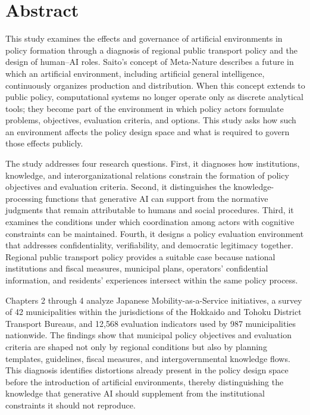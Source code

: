 
\chapter*{Abstract}

This study examines the effects and governance of artificial environments in policy formation through a diagnosis of regional public transport policy and the design of human--AI roles. Saito's concept of Meta-Nature describes a future in which an artificial environment, including artificial general intelligence, continuously organizes production and distribution. When this concept extends to public policy, computational systems no longer operate only as discrete analytical tools; they become part of the environment in which policy actors formulate problems, objectives, evaluation criteria, and options. This study asks how such an environment affects the policy design space and what is required to govern those effects publicly.

The study addresses four research questions. First, it diagnoses how institutions, knowledge, and interorganizational relations constrain the formation of policy objectives and evaluation criteria. Second, it distinguishes the knowledge-processing functions that generative AI can support from the normative judgments that remain attributable to humans and social procedures. Third, it examines the conditions under which coordination among actors with cognitive constraints can be maintained. Fourth, it designs a policy evaluation environment that addresses confidentiality, verifiability, and democratic legitimacy together. Regional public transport policy provides a suitable case because national institutions and fiscal measures, municipal plans, operators' confidential information, and residents' experiences intersect within the same policy process.

Chapters 2 through 4 analyze Japanese Mobility-as-a-Service initiatives, a survey of 42 municipalities within the jurisdictions of the Hokkaido and Tohoku District Transport Bureaus, and 12,568 evaluation indicators used by 987 municipalities nationwide. The findings show that municipal policy objectives and evaluation criteria are shaped not only by regional conditions but also by planning templates, guidelines, fiscal measures, and intergovernmental knowledge flows. This diagnosis identifies distortions already present in the policy design space before the introduction of artificial environments, thereby distinguishing the knowledge that generative AI should supplement from the institutional constraints it should not reproduce.

